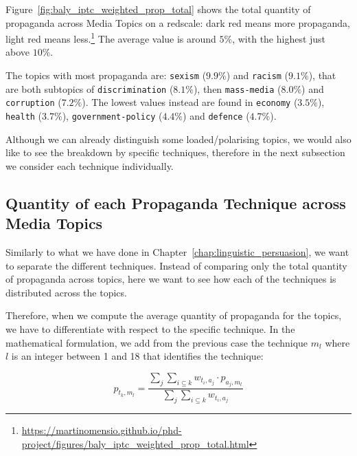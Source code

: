Figure~\ref{fig:baly_iptc_weighted_prop_total}
shows the total quantity of propaganda across Media Topics on a redscale: dark red means more propaganda, light red means less.\footnote{\url{https://martinomensio.github.io/phd-project/figures/baly_iptc_weighted_prop_total.html}}
The average value is around $5\%$, with the highest just above $10\%$.

The topics with most propaganda are: \texttt{sexism} ($9.9\%$) and \texttt{racism} ($9.1\%$), that are both subtopics of \texttt{discrimination} ($8.1\%$), then \texttt{mass-media} ($8.0\%$) and \texttt{corruption} ($7.2\%$). The lowest values instead are found in \texttt{economy} ($3.5\%$), \texttt{health} ($3.7\%$), \texttt{government-policy} ($4.4\%$) and \texttt{defence} ($4.7\%$).

Although we can already distinguish some loaded/polarising topics, we would also like to see the breakdown by specific techniques, therefore in the next subsection we consider each technique individually.

\subsection{\statusgreen Quantity of each Propaganda Technique across Media Topics}
\label{ssec:topic_propaganda_tech}

Similarly to what we have done in Chapter~\ref{chap:linguistic_persuasion}, we want to separate the different techniques. Instead of comparing only the total quantity of propaganda across topics, here we want to see how each of the techniques is distributed across the topics. 

Therefore, when we compute the average quantity of propaganda for the topics, we have to differentiate with respect to the specific technique. In the mathematical formulation, we add from the previous case the technique $m_{l}$ where $l$ is an integer between 1 and 18 that identifies the technique:

$$ p_{t_{k},m_{l}} = \frac{ \sum_{j} \sum_{i\subseteq k} w_{t_{i},a_{j}} \cdot p_{a_{j},m_{l}} }{ \sum_{j} \sum_{i\subseteq k} w_{t_{i},a_{j}} } $$


